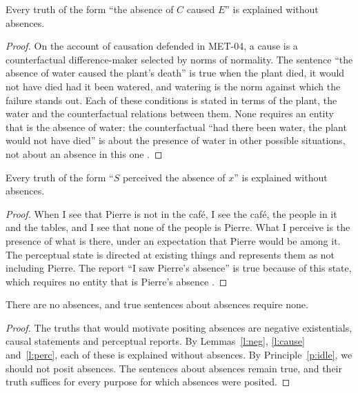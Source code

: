 \documentclass{situationist-preprint}
\begin{document}
\begin{lemma}\label{l:cause}
Every truth of the form \enquote{the absence of $C$ caused $E$} is explained without absences.
\end{lemma}

\begin{proof}
On the account of causation defended in MET-04, a cause is a counterfactual difference-maker selected by norms of normality. The sentence \enquote{the absence of water caused the plant's death} is true when the plant died, it would not have died had it been watered, and watering is the norm against which the failure stands out. Each of these conditions is stated in terms of the plant, the water and the counterfactual relations between them. None requires an entity that is the absence of water: the counterfactual \enquote{had there been water, the plant would not have died} is about the presence of water in other possible situations, not about an absence in this one \citep{Lewis2004}.
\end{proof}

\begin{lemma}\label{l:perc}
Every truth of the form \enquote{$S$ perceived the absence of $x$} is explained without absences.
\end{lemma}

\begin{proof}
When I see that Pierre is not in the café, I see the café, the people in it and the tables, and I see that none of the people is Pierre. What I perceive is the presence of what is there, under an expectation that Pierre would be among it. The perceptual state is directed at existing things and represents them as not including Pierre. The report \enquote{I saw Pierre's absence} is true because of this state, which requires no entity that is Pierre's absence \citep{Martin1996}.
\end{proof}

\begin{theorem}\label{t:main}
There are no absences, and true sentences about absences require none.
\end{theorem}

\begin{proof}
The truths that would motivate positing absences are negative existentials, causal statements and perceptual reports. By Lemmas~\ref{l:neg}, \ref{l:cause} and~\ref{l:perc}, each of these is explained without absences. By Principle~\ref{p:idle}, we should not posit absences. The sentences about absences remain true, and their truth suffices for every purpose for which absences were posited.
\end{proof}
\end{document}
